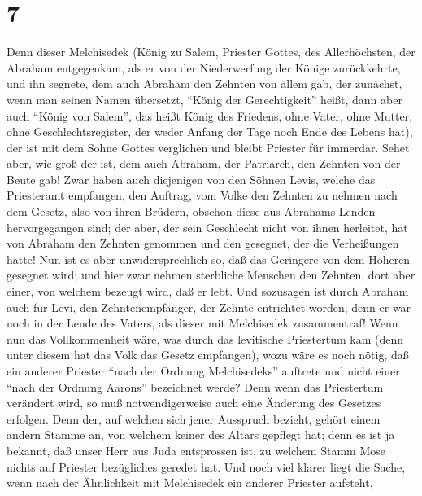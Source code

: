 \hypertarget{section-6}{%
\section{7}\label{section-6}}

 Denn dieser Melchisedek (König zu Salem, Priester Gottes,
des Allerhöchsten, der Abraham entgegenkam, als er von der Niederwerfung
der Könige zurückkehrte, und ihn segnete,  dem auch
Abraham den Zehnten von allem gab, der zunächst, wenn man seinen Namen
übersetzt, ``König der Gerechtigkeit'' heißt, dann aber auch ``König von
Salem'', das heißt König des Friedens,  ohne Vater, ohne
Mutter, ohne Geschlechtsregister, der weder Anfang der Tage noch Ende
des Lebens hat), der ist mit dem Sohne Gottes verglichen und bleibt
Priester für immerdar.  Sehet aber, wie groß der ist, dem
auch Abraham, der Patriarch, den Zehnten von der Beute gab!
 Zwar haben auch diejenigen von den Söhnen Levis, welche
das Priesteramt empfangen, den Auftrag, vom Volke den Zehnten zu nehmen
nach dem Gesetz, also von ihren Brüdern, obschon diese aus Abrahams
Lenden hervorgegangen sind;  der aber, der sein Geschlecht
nicht von ihnen herleitet, hat von Abraham den Zehnten genommen und den
gesegnet, der die Verheißungen hatte!  Nun ist es aber
unwidersprechlich so, daß das Geringere von dem Höheren gesegnet wird;
 und hier zwar nehmen sterbliche Menschen den Zehnten,
dort aber einer, von welchem bezeugt wird, daß er lebt. 
Und sozusagen ist durch Abraham auch für Levi, den Zehntenempfänger, der
Zehnte entrichtet worden;  denn er war noch in der Lende
des Vaters, als dieser mit Melchisedek zusammentraf! 
Wenn nun das Vollkommenheit wäre, was durch das levitische Priestertum
kam (denn unter diesem hat das Volk das Gesetz empfangen), wozu wäre es
noch nötig, daß ein anderer Priester ``nach der Ordnung Melchisedeks''
auftrete und nicht einer ``nach der Ordnung Aarons'' bezeichnet werde?
 Denn wenn das Priestertum verändert wird, so muß
notwendigerweise auch eine Änderung des Gesetzes erfolgen.
 Denn der, auf welchen sich jener Ausspruch bezieht,
gehört einem andern Stamme an, von welchem keiner des Altars gepflegt
hat;  denn es ist ja bekannt, daß unser Herr aus Juda
entsprossen ist, zu welchem Stamm Mose nichts auf Priester bezügliches
geredet hat.  Und noch viel klarer liegt die Sache, wenn
nach der Ähnlichkeit mit Melchisedek ein anderer Priester aufsteht,
